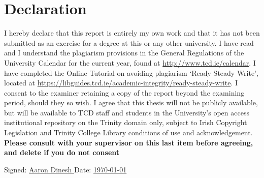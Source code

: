 \section*{\Huge\textcolor{tcd_blue}{Declaration}}
\noindent
I hereby declare that this report is entirely my own work and that it has not been submitted as an exercise for a degree at this or any other university.
\noindent
I have read and I understand the plagiarism provisions in the General Regulations of the University Calendar for the current year, found at \url{http://www.tcd.ie/calendar}.
\noindent
I have completed the Online Tutorial on avoiding plagiarism `Ready Steady Write', located at \url{https://libguides.tcd.ie/academic-integrity/ready-steady-write}.
\noindent
I consent to the examiner retaining a copy of the report beyond the examining period, should they so wish.
\noindent
I agree that this thesis will not be publicly available, but will be available to TCD staff and students in the University’s open access institutional repository on the Trinity domain only, subject to Irish Copyright Legislation and Trinity College Library conditions of use and acknowledgement.  \textbf{Please consult with your supervisor on this last item before agreeing, and delete if you do not consent}
\vspace{3cm}

Signed: \uline{\hfill Aaron Dinesh \hfill} \hfill Date: \uline{ \hfill \today \hfill}
\newpage